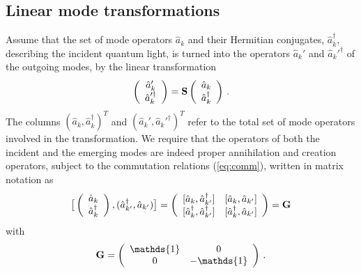\documentclass[12pt,amsmath,amssymb]{article}
\def\underline#1{{\bf #1}}
\numberwithin{equation}{section}
\begin{document}
\subsection{Linear mode transformations}

Assume that the set of mode operators $\hat{a}_k$ and their Hermitian
conjugates,  $\hat{a}_k^\dagger$, describing the incident quantum light,
is turned into the operators $\hat{a}_k'$ and  $\hat{a}_k'^\dagger$
of the outgoing modes, by the linear transformation
\begin{equation}
\label{eq:linear}
\left(
    \begin{array}{c}
     \hat{a}_k'  \\
     \hat{a}_k'^\dagger
    \end{array}
\right)
=
\underline{S}
\left(
    \begin{array}{c}
     \hat{a}_k  \\
     \hat{a}_k^\dagger
    \end{array}
\right)\,.
\end{equation}
The columns $(\hat{a}_k, \hat{a}_k^\dagger)^T$ and
$(\hat{a}_k', \hat{a}_k'^\dagger)^T$
refer to the total set of mode operators involved in the transformation.
We require that the operators of both the incident and the emerging
modes are indeed proper annihilation and creation operators,
subject to the commutation relations (\ref{eq:comm}),
written in matrix notation as
\begin{equation}
\label{eq:commatrix}
\big[\left(
    \begin{array}{c}
     \hat{a}_k  \\
     \hat{a}_k^\dagger
    \end{array}
\right),
(\hat{a}_{k'}^\dagger, \hat{a}_{k'})
\big]
=
\left(
    \begin{array}{cc}
      {[\hat{a}_k,  \hat{a}_{k'}^\dagger]} &
      {[\hat{a}_k,  \hat{a}_{k'}]} \\
      {[\hat{a}_k^\dagger,  \hat{a}_{k'}^\dagger]}  &
      {[\hat{a}_k^\dagger,  \hat{a}_{k'}]}
    \end{array}
\right)
= \underline{G}
\end{equation}
with
\begin{equation}
\underline{G} =
\left(
    \begin{array}{cc}
      \mathds{1} & 0 \\
       0 & -\mathds{1}
    \end{array}
\right)
\,.
\end{equation}
\end{document}
